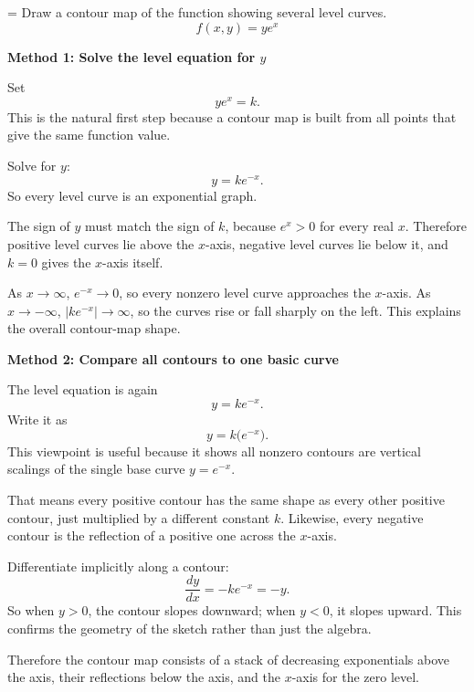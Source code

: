 \documentclass[a4paper,12pt,twocolumn]{article}
\newlength{\problemnumberwidth}
\newenvironment{solutionbox}{\begin{framed}}{\end{framed}}
\newcommand{\problem}[3]{%
  \Needspace{10\baselineskip}%
  \phantomsection\label{#1}%
  \par\vspace{0.8em}%
  \noindent
  \hangindent=\problemnumberwidth
  \hangafter=1
  \makebox[\problemnumberwidth][l]{\textbf{#2.}}#3\par
}
\begin{document}
\problem{prob:14-1-49}{49}{Draw a contour map of the function showing several level curves.
\[
f(x,y)=ye^x
\]}

\begin{solutionbox}
\textbf{Method 1: Solve the level equation for \(y\)}

\begin{steps}
\item Set
\[
ye^x=k.
\]
This is the natural first step because a contour map is built from all points that give the same function value.

\item Solve for \(y\):
\[
y=ke^{-x}.
\]
So every level curve is an exponential graph.

\item The sign of \(y\) must match the sign of \(k\), because \(e^x>0\) for every real \(x\). Therefore positive level curves lie above the \(x\)-axis, negative level curves lie below it, and \(k=0\) gives the \(x\)-axis itself.

\item As \(x\to\infty\), \(e^{-x}\to 0\), so every nonzero level curve approaches the \(x\)-axis. As \(x\to-\infty\), \(|ke^{-x}|\to\infty\), so the curves rise or fall sharply on the left. This explains the overall contour-map shape.
\end{steps}
\end{solutionbox}

\begin{solutionbox}
\textbf{Method 2: Compare all contours to one basic curve}

\begin{steps}
\item The level equation is again
\[
y=ke^{-x}.
\]
Write it as
\[
y=k\bigl(e^{-x}\bigr).
\]
This viewpoint is useful because it shows all nonzero contours are vertical scalings of the single base curve \(y=e^{-x}\).

\item That means every positive contour has the same shape as every other positive contour, just multiplied by a different constant \(k\). Likewise, every negative contour is the reflection of a positive one across the \(x\)-axis.

\item Differentiate implicitly along a contour:
\[
\frac{dy}{dx}=-ke^{-x}=-y.
\]
So when \(y>0\), the contour slopes downward; when \(y<0\), it slopes upward. This confirms the geometry of the sketch rather than just the algebra.

\item Therefore the contour map consists of a stack of decreasing exponentials above the axis, their reflections below the axis, and the \(x\)-axis for the zero level.
\end{steps}
\end{solutionbox}
\end{document}
